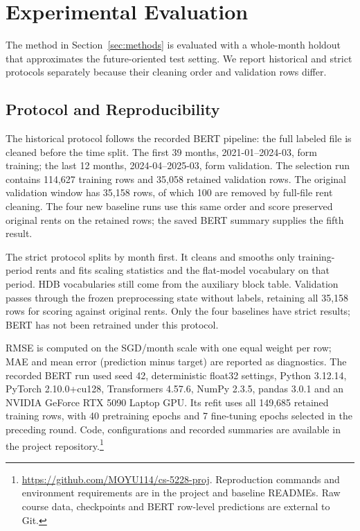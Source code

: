 \section{Experimental Evaluation}\label{sec:evaluation}
The method in Section~\ref{sec:methods} is evaluated with a whole-month holdout that approximates the future-oriented test setting.  We report historical and strict protocols separately because their cleaning order and validation rows differ.

\subsection{Protocol and Reproducibility}
The historical protocol follows the recorded BERT pipeline: the full labeled file is cleaned before the time split.  The first 39 months, 2021-01--2024-03, form training; the last 12 months, 2024-04--2025-03, form validation.  The selection run contains 114,627 training rows and 35,058 retained validation rows.  The original validation window has 35,158 rows, of which 100 are removed by full-file rent cleaning.  The four new baseline runs use this same order and score preserved original rents on the retained rows; the saved BERT summary supplies the fifth result.

The strict protocol splits by month first.  It cleans and smooths only training-period rents and fits scaling statistics and the flat-model vocabulary on that period.  HDB vocabularies still come from the auxiliary block table.  Validation passes through the frozen preprocessing state without labels, retaining all 35,158 rows for scoring against original rents.  Only the four baselines have strict results; BERT has not been retrained under this protocol.

RMSE is computed on the SGD/month scale with one equal weight per row; MAE and mean error (prediction minus target) are reported as diagnostics.  The recorded BERT run used seed 42, deterministic float32 settings, Python 3.12.14, PyTorch 2.10.0+cu128, Transformers 4.57.6, NumPy 2.3.5, pandas 3.0.1 and an NVIDIA GeForce RTX 5090 Laptop GPU.  Its refit uses all 149,685 retained training rows, with 40 pretraining epochs and 7 fine-tuning epochs selected in the preceding round.  Code, configurations and recorded summaries are available in the project repository.\footnote{\url{https://github.com/MOYU114/cs-5228-proj}. Reproduction commands and environment requirements are in the project and baseline READMEs. Raw course data, checkpoints and BERT row-level predictions are external to Git.}

